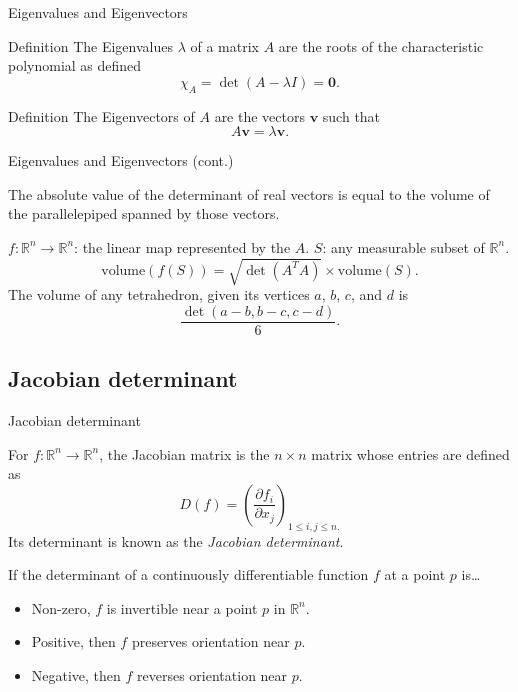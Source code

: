 \documentclass[handout]{beamer}
\begin{document}
\begin{frame}{Eigenvalues and Eigenvectors}

    \begin{block}{Definition}
        The Eigenvalues $\lambda$ of a matrix $A$ are the roots of the characteristic polynomial
        as defined
        \[
            \chi_A = \det(A - \lambda I) = \mathbf{0}.
        \]
    \end{block}

    \pause{}

    \begin{block}{Definition}
        The Eigenvectors of $A$ are the vectors $\mathbf{v}$ such that
        \[
            A\mathbf{v} = \lambda \mathbf{v}.
        \]
    \end{block}

\end{frame}

\begin{frame}{Eigenvalues and Eigenvectors (cont.)}

    The absolute value of the determinant of real vectors is equal to the volume
    of the parallelepiped spanned by those vectors.

    $f : \mathbb{R}^n \to \mathbb{R}^n$: the linear map represented by the $A$.
    $S$: any measurable subset of $\mathbb{R}^n$.
    \[
        \text{volume}(f(S)) = \sqrt{\det{({A^T}A)}} \times \text{volume}(S).
    \]
    The volume of any tetrahedron, given its vertices $a$, $b$, $c$, and $d$ is
    \[
        \frac{\det(a - b, b - c, c - d)}{6}.
    \]

\end{frame}

\subsection{Jacobian determinant}

\begin{frame}{Jacobian determinant}

    For $f : \mathbb{R}^n \to \mathbb{R}^n$,
    the Jacobian matrix is the $n \times n$ matrix whose entries are defined as
    \[
        D(f) = {\left( \frac{\partial f_i}{\partial x_j} \right)}_{1 \leq i, j \leq n.}
    \]
    Its determinant is known as the \emph{Jacobian determinant}.

    \pause{}

    \begin{exampleblock}{}
        If the determinant of a continuously differentiable function $f$ at a point $p$ is\dots
        \begin{itemize}
            \item Non-zero, $f$ is invertible near a point $p$ in $\mathbb{R}^n$.
            \item Positive, then $f$ preserves orientation near $p$.
            \item Negative, then $f$ reverses orientation near $p$.
        \end{itemize}
    \end{exampleblock}

\end{frame}
\end{document}
